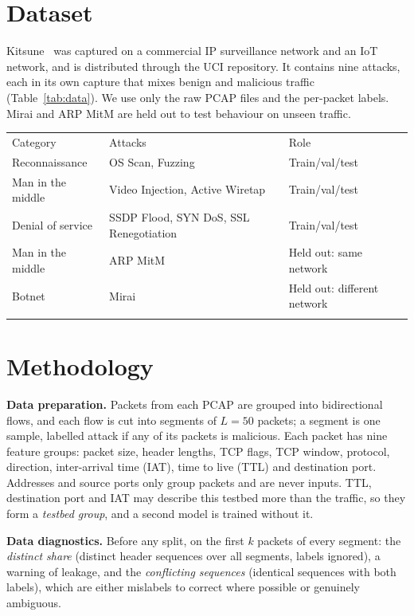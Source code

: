 \documentclass[11pt]{article}
\makeatletter
\newcommand{\toprule}{\noalign{\hrule height 0.8pt\vskip 3pt}}
\newcommand{\midrule}{\noalign{\vskip 2pt\hrule height 0.4pt\vskip 3pt}}
\newcommand{\bottomrule}{\noalign{\vskip 2pt\hrule height 0.8pt}}
\newenvironment{ptable}{\par\medskip\noindent\begin{minipage}{\linewidth}\centering\def\@captype{table}}{\end{minipage}\par\medskip}
\makeatother
\begin{document}
\section{Dataset}

Kitsune~\cite{kitsune} was captured on a commercial IP surveillance network and an IoT network, and is distributed through the UCI repository. It contains nine attacks, each in its own capture that mixes benign and malicious traffic (Table~\ref{tab:data}). We use only the raw PCAP files and the per-packet labels. Mirai and ARP MitM are held out to test behaviour on unseen traffic.

\begin{ptable}
\small
\begin{tabular}{@{}lll@{}}
\toprule
Category & Attacks & Role \\
\midrule
Reconnaissance & OS Scan, Fuzzing & Train/val/test \\
Man in the middle & Video Injection, Active Wiretap & Train/val/test \\
Denial of service & SSDP Flood, SYN DoS, SSL Renegotiation & Train/val/test \\
Man in the middle & ARP MitM & Held out: same network \\
Botnet & Mirai & Held out: different network \\
\bottomrule
\end{tabular}
\caption{Kitsune attacks and their role in this project.}\label{tab:data}
\end{ptable}

\section{Methodology}

\textbf{Data preparation.} Packets from each PCAP are grouped into bidirectional flows, and each flow is cut into
segments of $L = 50$ packets; a segment is one sample, labelled attack if any of its packets is malicious. Each packet
has nine feature groups: packet size, header lengths, TCP flags, TCP window, protocol, direction, inter-arrival time
(IAT), time to live (TTL) and destination port. Addresses and source ports only group packets and are never inputs.
TTL, destination port and IAT may describe this testbed more than the traffic, so they form a \emph{testbed group},
and a second model is trained without it.

\textbf{Data diagnostics.} Before any split, on the first $k$ packets of every segment: the \emph{distinct share}
(distinct header sequences over all segments, labels ignored), a warning of leakage, and the \emph{conflicting
sequences} (identical sequences with both labels), which are either mislabels to correct where possible or genuinely
ambiguous.
\end{document}
